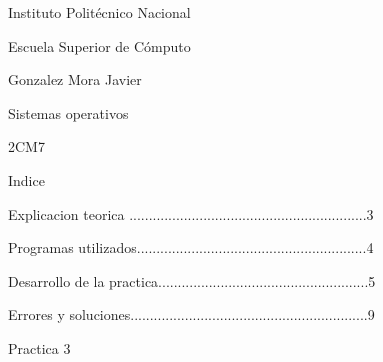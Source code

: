 \documentclass[12pt, a4paper]{report}
\begin{document}
\begin{LARGE}
\begin{center}

Instituto Politécnico Nacional

\bigskip
\bigskip

Escuela Superior de Cómputo

\bigskip
\bigskip

Gonzalez Mora Javier

\bigskip
\bigskip

Sistemas operativos

\bigskip
\bigskip

2CM7


\end{center}
\end{LARGE}

\newpage

\begin{center}

Indice

\end{center}

\bigskip
\bigskip

\begin{flushleft}
Explicacion teorica .............................................................3

\bigskip

Programas utilizados...........................................................4

\bigskip

Desarrollo de la practica......................................................5

\bigskip

Errores y soluciones.............................................................9

\bigskip

\end{flushleft}

\bigskip
\bigskip

\bigskip

\newpage




\begin{center}

Practica 3

\end{center}
\end{document}
